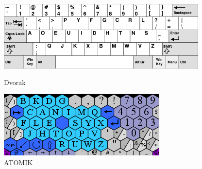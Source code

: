 \documentclass[times, utf8, zavrsni]{fer}
\begin{document}
\begin{figure}[htb]
  \centering
  \begin{minipage}[b]{0.45\textwidth}
    \includegraphics[width=\textwidth]{img/dvorak.png}
    \caption{Dvorak}
    \label{fig:dvorak}
  \end{minipage}
  \hfill
  \begin{minipage}[b]{0.45\textwidth}
    \includegraphics[width=\textwidth]{img/atomik.png}
    \caption{ATOMIK}
    \label{fig:atomik}
  \end{minipage}
\end{figure}
\end{document}
